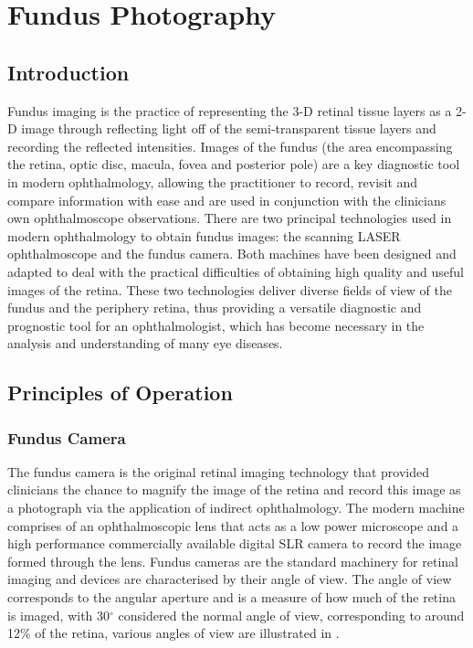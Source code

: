 
\chapter{Fundus Photography}
\label{fundus_photography}
\section{Introduction}

Fundus imaging is the practice of representing the 3-D retinal tissue layers as a 2-D image through reflecting light off of the semi-transparent tissue layers and recording the reflected intensities. Images of the fundus (the area encompassing the retina, optic disc, macula, fovea and posterior pole) are a key diagnostic tool in modern ophthalmology, allowing the practitioner to record, revisit and compare information with ease and are used in conjunction with the clinicians own ophthalmoscope observations. There are two principal technologies used in modern ophthalmology to obtain fundus images: the scanning LASER ophthalmoscope and the fundus camera. Both machines have been designed and adapted to deal with the practical difficulties of obtaining high quality and useful images of the retina. These two technologies deliver diverse fields of view of the fundus and the periphery retina, thus providing a versatile diagnostic and prognostic tool for an ophthalmologist, which has become necessary in the analysis and understanding of many eye diseases.


\section{Principles of Operation}

\subsection{Fundus Camera}

The fundus camera is the original retinal imaging technology that provided clinicians the chance to magnify the image of the retina and record this image as a photograph via the application of indirect ophthalmology. The modern machine comprises of an ophthalmoscopic lens that acts as a low power microscope and a high performance commercially available digital SLR camera to record the image formed through the lens. Fundus cameras are the standard machinery for retinal imaging and devices are characterised by their angle of view. The angle of view corresponds to the angular aperture and is a measure of how much of the retina is imaged, with 30$^\circ$ considered the normal angle of view, corresponding to around 12\% of the retina, various angles of view are illustrated in .

